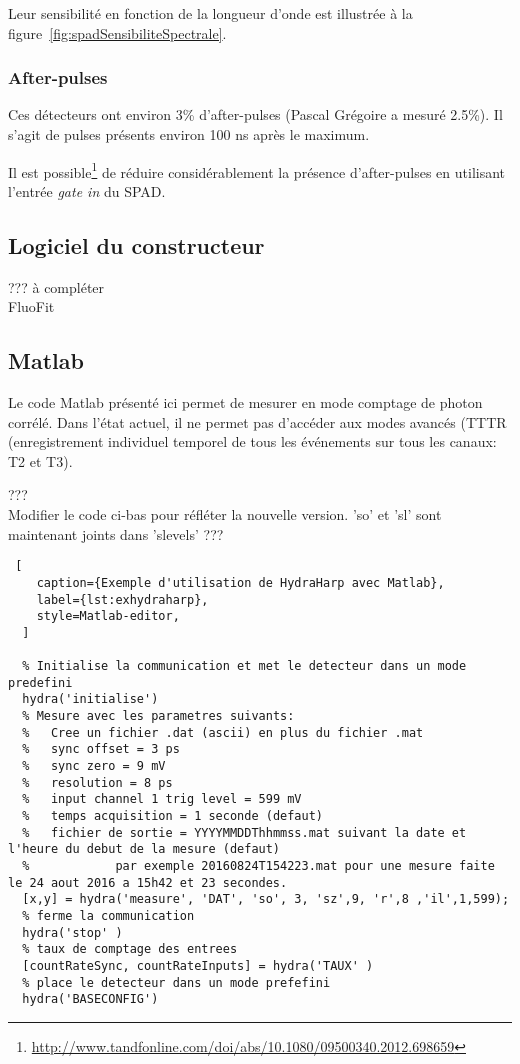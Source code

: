 \documentclass[11pt,francais]{book} %
\begin{document}
Leur sensibilité en fonction de la longueur d'onde est illustrée à la figure~\ref{fig:spadSensibiliteSpectrale}.

\subsubsection{After-pulses}
Ces détecteurs ont environ 3\% d'after-pulses (Pascal Grégoire a mesuré 2.5\%).
Il s'agit de pulses présents environ 100 ns après le maximum.

Il est possible\footnote{\url{http://www.tandfonline.com/doi/abs/10.1080/09500340.2012.698659}} de réduire considérablement la présence d'after-pulses en utilisant l'entrée {\it gate in} du SPAD.

\subsection{Logiciel du constructeur}

??? à compléter \\
FluoFit

\subsection{Matlab}

Le code Matlab présenté ici permet de mesurer en mode comptage de photon corrélé.
Dans l'état actuel, il ne permet pas d'accéder aux modes avancés (TTTR (enregistrement individuel temporel de tous les événements sur tous les canaux: T2 et T3).


??? \\
Modifier le code ci-bas pour réfléter la nouvelle version.
'so' et 'sl' sont maintenant joints dans 'slevels'
??? \\

\begin{lstlisting} [
    caption={Exemple d'utilisation de HydraHarp avec Matlab},
    label={lst:exhydraharp},
    style=Matlab-editor,
  ]
  
  % Initialise la communication et met le detecteur dans un mode predefini
  hydra('initialise')
  % Mesure avec les parametres suivants:
  %   Cree un fichier .dat (ascii) en plus du fichier .mat
  %   sync offset = 3 ps
  %   sync zero = 9 mV
  %   resolution = 8 ps
  %   input channel 1 trig level = 599 mV
  %   temps acquisition = 1 seconde (defaut)
  %   fichier de sortie = YYYYMMDDThhmmss.mat suivant la date et l'heure du debut de la mesure (defaut)
  %            par exemple 20160824T154223.mat pour une mesure faite le 24 aout 2016 a 15h42 et 23 secondes.
  [x,y] = hydra('measure', 'DAT', 'so', 3, 'sz',9, 'r',8 ,'il',1,599);
  % ferme la communication
  hydra('stop' )
  % taux de comptage des entrees
  [countRateSync, countRateInputs] = hydra('TAUX' )
  % place le detecteur dans un mode prefefini
  hydra('BASECONFIG')

\end{lstlisting}
\end{document}
